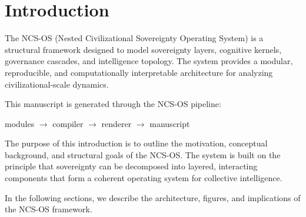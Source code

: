 \section{Introduction}

The NCS-OS (Nested Civilizational Sovereignty Operating System) is a structural framework designed to model sovereignty layers, cognitive kernels, governance cascades, and intelligence topology. The system provides a modular, reproducible, and computationally interpretable architecture for analyzing civilizational-scale dynamics.

This manuscript is generated through the NCS-OS pipeline:
\begin{center}
modules $\rightarrow$ compiler $\rightarrow$ renderer $\rightarrow$ manuscript
\end{center}

The purpose of this introduction is to outline the motivation, conceptual background, and structural goals of the NCS-OS. The system is built on the principle that sovereignty can be decomposed into layered, interacting components that form a coherent operating system for collective intelligence.

In the following sections, we describe the architecture, figures, and implications of the NCS-OS framework.
